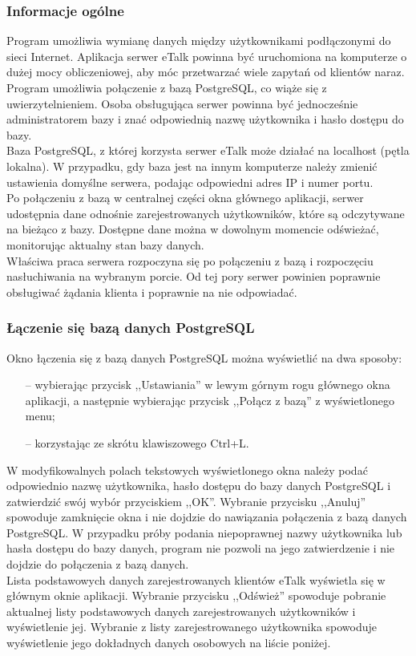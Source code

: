 \documentclass[a4paper,12pt]{article}
\begin{document}
\subsubsection[Informacje ogólne]{Informacje ogólne}
Program umożliwia wymianę danych między użytkownikami podłączonymi do sieci Internet.
Aplikacja serwer eTalk powinna być uruchomiona na komputerze o dużej mocy obliczeniowej, aby móc przetwarzać wiele zapytań od klientów naraz.\\
Program umożliwia połączenie z bazą PostgreSQL, co wiąże się z uwierzytelnieniem. Osoba obsługująca serwer powinna być jednocześnie administratorem bazy i znać odpowiednią nazwę użytkownika i hasło dostępu do bazy.\\
Baza PostgreSQL, z której korzysta serwer eTalk może działać na localhost (pętla lokalna). W przypadku, gdy baza jest na innym komputerze należy zmienić ustawienia domyślne serwera, podając odpowiedni adres IP i numer portu.\\
Po połączeniu z bazą w centralnej części okna głównego aplikacji, serwer udostępnia dane odnośnie zarejestrowanych użytkowników, które są odczytywane na bieżąco z bazy. Dostępne dane można w dowolnym momencie odświeżać, monitorując aktualny stan bazy danych.\\
Właściwa praca serwera rozpoczyna się po połączeniu z bazą i rozpoczęciu nasłuchiwania na wybranym porcie.
Od tej pory serwer powinien poprawnie obsługiwać żądania klienta i poprawnie na nie odpowiadać.

\subsubsection[Łączenie się bazą danych PostgreSQL]{Łączenie się bazą danych PostgreSQL}
Okno łączenia się z bazą danych PostgreSQL można wyświetlić na dwa sposoby:
\begin{itemize}
\item[--] wybierając przycisk ,,Ustawiania'' w lewym górnym rogu głównego okna aplikacji,
a następnie wybierając przycisk ,,Połącz z bazą'' z wyświetlonego menu;
\item[--] korzystając ze skrótu klawiszowego Ctrl+L.
\end{itemize}
W modyfikowalnych polach tekstowych wyświetlonego okna należy podać odpowiednio nazwę użytkownika, hasło dostępu do bazy danych PostgreSQL i zatwierdzić swój wybór przyciskiem ,,OK''.
Wybranie przycisku ,,Anuluj'' spowoduje zamknięcie okna i nie dojdzie do nawiązania
połączenia z bazą danych PostgreSQL.
W przypadku próby podania niepoprawnej nazwy użytkownika lub hasła dostępu do bazy danych, program nie pozwoli na jego
zatwierdzenie i nie dojdzie do połączenia z bazą danych.\\
Lista podstawowych danych zarejestrowanych klientów eTalk wyświetla się w głównym oknie aplikacji.
Wybranie przycisku ,,Odśwież'' spowoduje pobranie aktualnej listy podstawowych danych zarejestrowanych użytkowników i wyświetlenie jej.
Wybranie z listy zarejestrowanego użytkownika spowoduje wyświetlenie jego dokładnych danych osobowych na liście poniżej.
\end{document}

